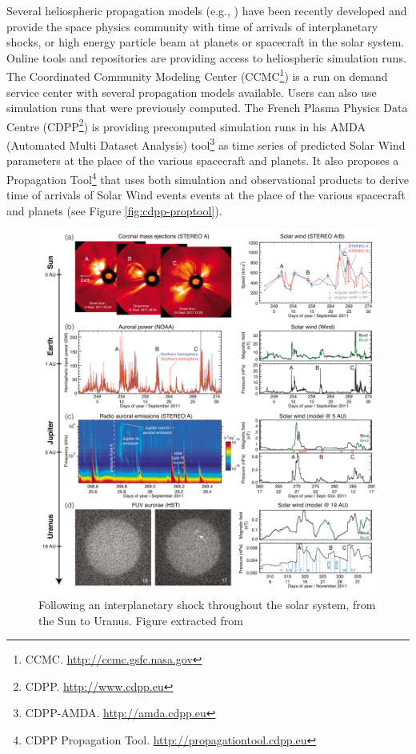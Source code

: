 \documentclass[referee,a4paper,12pt,traditabstract]{swsc}
\begin{document}
\begin{linenumbers}
Several heliospheric propagation models (e.g., \cite{Tao05,zieger08}) have been recently developed and provide the space physics community with time of arrivals of interplanetary shocks, or high energy particle beam at planets or spacecraft in the solar system. Online tools and repositories are providing access to heliospheric simulation runs. The Coordinated Community Modeling Center (CCMC\footnote{CCMC. \url{http://ccmc.gsfc.nasa.gov}}) is a run on demand service center with several propagation models available. Users can also use simulation runs that were previously computed. The French Plasma Physics Data Centre (CDPP\footnote{CDPP. \url{http://www.cdpp.eu}}) is providing precomputed simulation runs in his AMDA (Automated Multi Dataset Analysis) tool\footnote{CDPP-AMDA. \url{http://amda.cdpp.eu}} as time series of predicted Solar Wind parameters at the place of the various spacecraft and planets. It also proposes a Propagation Tool\footnote{CDPP Propagation Tool. \url{http://propagationtool.cdpp.eu}} that uses both simulation and observational products to derive time of arrivals of Solar Wind events events at the place of the various spacecraft and planets (see Figure \ref{fig:cdpp-proptool}).

\begin{figure}
\centering\includegraphics[width=\linewidth]{pasted-image-1213.png}
\caption{Following an interplanetary shock throughout the solar system, from the Sun to Uranus. Figure extracted from \cite{Lamy12}}
\label{fig:ips-uranus}
\end{figure}



\end{linenumbers}
\end{document}
